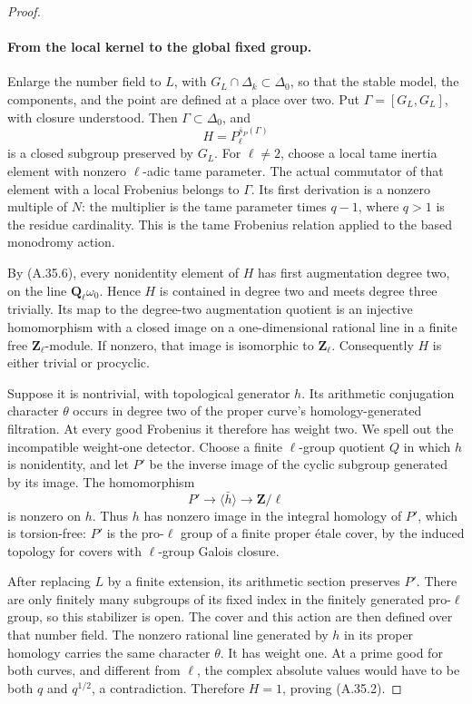 \begin{proof}
\paragraph{From the local kernel to the global fixed group.}
Enlarge the number field to \(L\), with
\(G_L\cap\Delta_k\subset\Delta_0\), so that the stable model,
the components, and the point are defined at a place over
two. Put \(\Gamma=[G_L,G_L]\), with closure understood.
Then \(\Gamma\subset\Delta_0\), and
\[
                       H=P_\ell^{\bar s_P(\Gamma)}
\]
is a closed subgroup preserved by \(G_L\).
For \(\ell\ne2\), choose a local tame inertia element with
nonzero \(\ell\)-adic tame parameter. The actual commutator
of that element with a local Frobenius belongs to \(\Gamma\).
Its first derivation is a nonzero multiple of \(N\):
the multiplier is the tame parameter times \(q-1\), where
\(q>1\) is the residue cardinality. This is the tame
Frobenius relation applied to the based monodromy action.

By (A.35.6), every nonidentity element of \(H\) has first
augmentation degree two, on the line
\(\mathbf Q_\ell\omega_0\). Hence \(H\) is contained in
degree two and meets degree three trivially. Its map to
the degree-two augmentation quotient is an injective
homomorphism with a closed image on a one-dimensional
rational line in a finite free \(\mathbf Z_\ell\)-module.
If nonzero, that image is isomorphic to \(\mathbf Z_\ell\).
Consequently \(H\) is either trivial or procyclic.

Suppose it is nontrivial, with topological generator \(h\).
Its arithmetic conjugation character \(\theta\) occurs
in degree two of the proper curve's homology-generated
filtration. At every good Frobenius it therefore has
weight two. We spell out the incompatible weight-one
detector. Choose a finite \(\ell\)-group quotient \(Q\)
in which \(h\) is nonidentity, and let \(P'\) be the
inverse image of the cyclic subgroup generated by its
image. The homomorphism
\[
              P'\longrightarrow\langle\bar h\rangle
                      \longrightarrow\mathbf Z/\ell
\]
is nonzero on \(h\). Thus \(h\) has nonzero image in
the integral homology of \(P'\), which is torsion-free:
\(P'\) is the pro-\(\ell\) group of a finite proper
\'etale cover, by the induced topology for covers with
\(\ell\)-group Galois closure.

After replacing \(L\) by a finite extension, its arithmetic
section preserves \(P'\). There are only finitely many
subgroups of its fixed index in the finitely generated
pro-\(\ell\) group, so this stabilizer is open. The cover
and this action are then defined over that number field.
The nonzero rational line generated by \(h\) in its
proper homology carries the same character \(\theta\).
It has weight one. At a prime good for both curves, and
different from \(\ell\), the complex absolute values
would have to be both \(q\) and \(q^{1/2}\), a contradiction.
Therefore \(H=1\), proving (A.35.2).


\end{proof}
